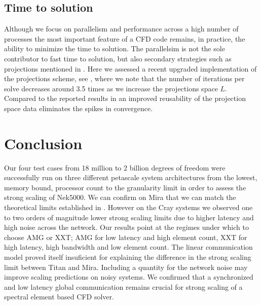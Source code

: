 \documentclass{sig-alternate}
\begin{document}
\subsection{Time to solution}
Although we focus on parallelism and performance across a high number of processes the most important feature of a CFD code remains, in practice, the ability to minimize the time to solution. The parallelsim is not the sole contributor to fast time to solution, but also secondary strategies such as projections mentioned in . Here we assessed a recent upgraded implementation of the projections scheme, see , where we note that the number of iterations per solve decreases around 3.5 times as we increase the projections space $L$. Compared to the reported results in \cite{Fischer1998} an improved reusability of the projection space data eliminates the spikes in convergence.


\section{Conclusion}
Our four test cases from 18 million to 2 billion degrees of freedom were
successfully run on three different petascale system architectures from the
lowest, memory bound, processor count to the granularity limit in order to
assess the strong scaling of Nek5000. We can confirm on Mira that  we can match the theoretical limits established in \cite{fischer:scaling}. However on the Cray systems we observed one to two orders of magnitude
lower strong scaling limits due to higher
latency and high noise across the network. %
Our results point at the regimes under which to choose AMG or
XXT; AMG for low latency and high element count, XXT for high latency, high
bandwidth and low element count. The linear communication model proved itself insuficient for explaining the difference in
the strong scaling limit between Titan and Mira. Including a 
quantity for the network noise may improve scaling predictions on noisy systems.
We confirmed that a synchronized and low latency global communication remains crucial for strong scaling of a spectral element based CFD solver.

\end{document}
